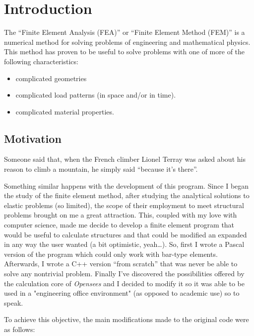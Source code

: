 \chapter{Introduction}

The ``Finite Element Analysis (FEA)'' or ``Finite Element Method (FEM)'' is a numerical method for solving problems of engineering and mathematical physics. This method has proven to be useful to solve problems with one of more of the following characteristics:

\begin{itemize}
\item complicated geometries
\item complicated load patterns (in space and/or in time).
\item complicated material properties.
\end{itemize}

\section{Motivation}
Someone said that, when the French climber Lionel Terray was asked about his reason to climb a mountain, he simply said ``because it's there''.

Something similar happens with the development of this program. Since I began the study of the finite element method, after studying the analytical solutions to elastic problems (so limited), the scope of their employment to meet structural problems brought on me a great attraction. This, coupled with my love with computer science, made me decide to develop a finite element program that would be useful to calculate structures and that could be modified an expanded in any way the user wanted (a bit optimistic, yeah\ldots). So, first I wrote a Pascal version of the program which could only work with bar-type elements. Afterwards, I wrote a C++ version ``from scratch'' that was never be able to solve any nontrivial problem. Finally I've discovered the possibilities offered by the calculation core of \emph{Opensees} and I decided to modify it so it was able to be used in a "engineering office environment" (as opposed to academic use) so to speak.

To achieve this objective, the main modifications made to the original code were as follows:

